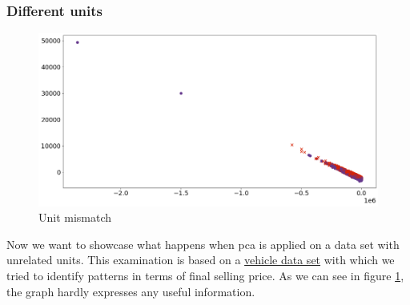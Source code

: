 


\subsubsection{Different units}

\begin{figure}[h]
    \centering
    \includegraphics[width=0.8\linewidth]{external_content/media/wrong_units/graph.png}
    \captionsetup{justification=centering}
    \caption{Unit mismatch}
    \label{fig:unitMismatch}
\end{figure}

\noindent
Now we want to showcase what happens when \gls{pca} is applied on a data set with unrelated units.
This examination is based on a \href{https://www.kaggle.com/nehalbirla/vehicle-dataset-from-cardekho?select=Car+details+v3.csv}{vehicle data set} with which we tried to identify patterns in terms of final selling price.
As we can see in figure \ref{fig:unitMismatch}, the graph hardly expresses any useful information.








\clearpage





